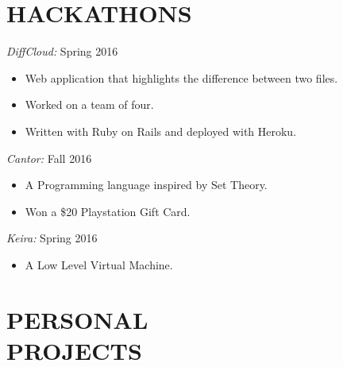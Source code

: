 \documentclass[margin, 10pt]{res} %
\begin{document}
\begin{resume}


\section{HACKATHONS}
        {\sl DiffCloud:} \hfill Spring 2016\\
        \begin{itemize}
        \item Web application that highlights the difference between two files.
        \item Worked on a team of four.
        \item Written with Ruby on Rails and deployed with Heroku.
        \end{itemize}
        {\sl Cantor:} \hfill Fall 2016\\
        \begin{itemize}
        \item A Programming language inspired by Set Theory.
        \item Won a \$20 Playstation Gift Card. 
                
        \end{itemize}

        
         {\sl Keira:} \hfill Spring 2016\\
        \begin{itemize}
        \item A Low Level Virtual Machine.
        \end{itemize}


        \section{PERSONAL \\ PROJECTS}


\end{resume}
\end{document}
